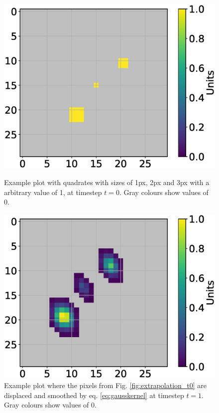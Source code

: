 \documentclass[11pt,twoside,a4paper,fleqn,x11names]{report}
\numberwithin{equation}{chapter}
\numberwithin{figure}{chapter}
\numberwithin{table}{chapter}
\begin{document}
\begin{figure}[h]
	\centering
	\begin{minipage}{0.48\textwidth}
		\includegraphics[width=\textwidth,trim={38mm 0 10mm 5mm},clip]{Extrapolation_t0.eps}
		\caption{Example plot with quadrates with sizes of 1px, 2px and 3px with a arbitrary value of 1, at timestep $t=0$. Gray colours show values of 0.}
		\label{fig:extrapolation_t0}
	\end{minipage}\hfill
	\begin{minipage}{0.48\textwidth}
		\includegraphics[width=\textwidth,trim={38mm 0 10mm 5mm},clip]{Extrapolation_t1.eps}
		\caption{Example plot where the pixels from Fig. \ref{fig:extrapolation_t0} are displaced and smoothed by eq. \ref{eq:gausskernel} at timestep $t=1$. Gray colours show values of 0.}
		\label{fig:extrapolation_t1}
	\end{minipage}
\end{figure}
\FloatBarrier
\end{document}
